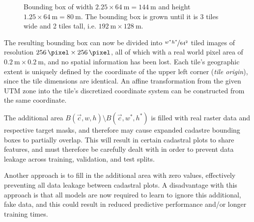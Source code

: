 \begin{figure}[H]
  \centering
  
  \caption{
    Bounding box of width $2.25 \times \SI{64}{\meter} = \SI{144}{\meter}$ and height $1.25 \times \SI{64}{\meter} = \SI{80}{\meter}$.
    The bounding box is grown until it is 3 tiles wide and 2 tiles tall, i.e. $\SI{192}{\meter} \times \SI{128}{\meter}$.
  }%
  \label{fig:bbox-growing}
\end{figure}

The resulting bounding box can now be divided into $\nicefrac{w^*h^*}{64^2}$ tiled images of resolution $\SI{256}{\pixel} \times \SI{256}{\pixel}$, all of which with a real world pixel area of $\SI{0.2}{\meter} \times \SI{0.2}{\meter}$, and no spatial information has been lost.
Each tile's geographic extent is uniquely defined by the coordinate of the upper left corner (\textit{tile origin}), since the tile dimensions are identical.
An affine transformation from the given UTM zone into the tile's discretized coordinate system can be constructed from the same coordinate.

The additional area $B(\vec{c}, w, h) \setminus B(\vec{c}, w^*, h^*)$ is filled with real raster data and respective target masks, and therefore may cause expanded cadastre bounding boxes to partially overlap.
This will result in certain cadastral plots to share features, and must therefore be carefully dealt with in order to prevent data leakage across training, validation, and test splits.

Another approach is to fill in the additional area with zero values, effectively preventing all data leakage between cadastral plots.
A disadvantage with this approach is that all models are now required to learn to ignore this additional, fake data, and this could result in reduced predictive performance and/or longer training times.
